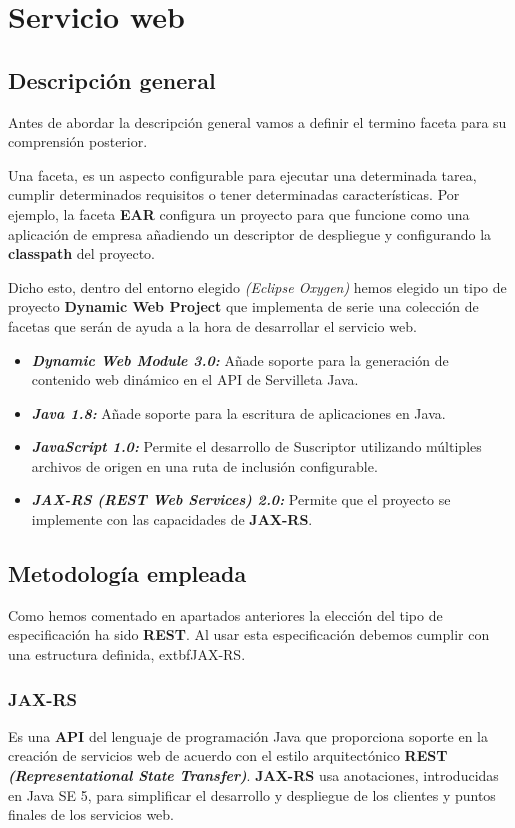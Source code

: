 \section{Servicio web}
\subsection{Descripción general}
Antes de abordar la descripción general vamos a definir el termino faceta para su comprensión posterior.
\begin{shaded}
	\begin{flushleft}
	Una faceta, es un aspecto configurable para ejecutar una determinada tarea, cumplir determinados requisitos o tener determinadas características. Por ejemplo, la faceta \textbf{EAR} configura un proyecto para que funcione como una aplicación de empresa añadiendo un descriptor de despliegue y configurando la \textbf{classpath} del proyecto. 
	\end{flushleft}			
\end{shaded}
Dicho esto, dentro del entorno elegido \textit{(Eclipse Oxygen)} hemos elegido un tipo de proyecto \textbf{Dynamic Web Project} que implementa de serie una colección de facetas que serán de ayuda a la hora de desarrollar el servicio web.

\begin{itemize}
	
	\item \emph{\textbf{Dynamic Web Module 3.0: }} Añade soporte para la generación de contenido web dinámico en el API de Servilleta Java.
	\item \emph{\textbf{Java 1.8: }} Añade soporte para la escritura de aplicaciones en  Java.
	\item \emph{\textbf{JavaScript 1.0: }} Permite el desarrollo de Suscriptor utilizando múltiples archivos de origen en una ruta de inclusión configurable.
	\item \emph{\textbf{JAX-RS (REST Web Services) 2.0: }} Permite que el proyecto se implemente con las capacidades de \textbf{JAX-RS}.
\end{itemize}
\subsection{Metodología empleada}
Como hemos comentado en apartados anteriores la elección del tipo de especificación ha sido \textbf{REST}. Al usar esta especificación debemos cumplir con una estructura definida, extbf{JAX-RS}.
\subsubsection{JAX-RS}
Es una \textbf{API} del lenguaje de programación Java que proporciona soporte en la creación de servicios web de acuerdo con el estilo arquitectónico \textbf{REST \textit{(Representational State Transfer)}}. \textbf{JAX-RS} usa anotaciones, introducidas en Java SE 5, para simplificar el desarrollo y despliegue de los clientes y puntos finales de los servicios web.\cite{jaxrs}

